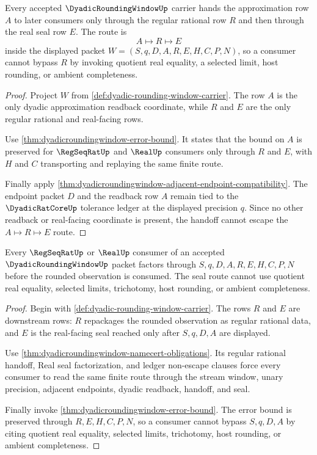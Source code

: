 \begin{theorem}
\label{thm:dyadicroundingwindow-readback-handoff}
Every accepted $\DyadicRoundingWindowUp$ carrier hands the approximation row $A$ to later consumers only through the regular rational row $R$ and then through the real seal row $E$. The route is
$$
A\longmapsto R\longmapsto E
$$
inside the displayed packet $W=(S,q,D,A,R,E,H,C,P,N)$, so a consumer cannot bypass $R$ by invoking quotient real equality, a selected limit, host rounding, or ambient completeness.
\end{theorem}
\begin{proof}
Project $W$ from \autoref{def:dyadic-rounding-window-carrier}. The row $A$ is the only dyadic approximation readback coordinate, while $R$ and $E$ are the only regular rational and real-facing rows.

Use \autoref{thm:dyadicroundingwindow-error-bound}. It states that the bound on $A$ is preserved for $\RegSeqRatUp$ and $\RealUp$ consumers only through $R$ and $E$, with $H$ and $C$ transporting and replaying the same finite route.

Finally apply \autoref{thm:dyadicroundingwindow-adjacent-endpoint-compatibility}. The endpoint packet $D$ and the readback row $A$ remain tied to the $\DyadicRatCoreUp$ tolerance ledger at the displayed precision $q$. Since no other readback or real-facing coordinate is present, the handoff cannot escape the $A\mapsto R\mapsto E$ route.
\end{proof}

\begin{theorem}
\label{thm:dyadicroundingwindow-real-seal-factorization}
Every $\RegSeqRatUp$ or $\RealUp$ consumer of an accepted $\DyadicRoundingWindowUp$ packet factors through $S,q,D,A,R,E,H,C,P,N$ before the rounded observation is consumed. The seal route cannot use quotient real equality, selected limits, trichotomy, host rounding, or ambient completeness.
\end{theorem}
\begin{proof}
Begin with \autoref{def:dyadic-rounding-window-carrier}. The rows $R$ and $E$ are downstream rows: $R$ repackages the rounded observation as regular rational data, and $E$ is the real-facing seal reached only after $S,q,D,A$ are displayed.

Use \autoref{thm:dyadicroundingwindow-namecert-obligations}. Its regular rational handoff, Real seal factorization, and ledger non-escape clauses force every consumer to read the same finite route through the stream window, unary precision, adjacent endpoints, dyadic readback, handoff, and seal.

Finally invoke \autoref{thm:dyadicroundingwindow-error-bound}. The error bound is preserved through $R,E,H,C,P,N$, so a consumer cannot bypass $S,q,D,A$ by citing quotient real equality, selected limits, trichotomy, host rounding, or ambient completeness.
\end{proof}

